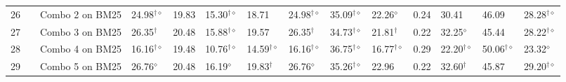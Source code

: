 \begin{table*}
{\begin{tabular}{ccllllllllllll}
26  &  & Combo 2 on BM25  & 24.98$^{\dagger\diamond}$  & 19.83  & 15.30$^{\dagger\diamond}$  & 18.71  & 24.98$^{\dagger\diamond}$  & 35.09$^{\dagger\diamond}$  & 22.26$^{\diamond}$  & 0.24  & 30.41  & 46.09  & 28.28$^{\dagger\diamond}$ \tabularnewline
27  &  & Combo 3 on BM25  & 26.35$^{\dagger}$  & 20.48  & 15.88$^{\dagger\diamond}$  & 19.57  & 26.35$^{\dagger}$  & 34.73$^{\dagger\diamond}$  & 21.81$^{\dagger}$  & 0.22  & 32.25$^{\diamond}$  & 45.44  & 28.22$^{\dagger\diamond}$\tabularnewline
28  &  & Combo 4 on BM25  & 16.16$^{\dagger\diamond}$  & 19.48  & 10.76$^{\dagger\diamond}$  & 14.59$^{\dagger\diamond}$  & 16.16$^{\dagger\diamond}$  & 36.75$^{\dagger\diamond}$  & 16.77$^{\dagger\diamond}$  & 0.29  & 22.20$^{\dagger\diamond}$  & 50.06$^{\dagger\diamond}$  & 23.32$^{\diamond}$\tabularnewline
29  &  & Combo 5 on BM25  & 26.76$^{\diamond}$  & 20.48  & 16.19$^{\diamond}$  & 19.83$^{\dagger}$  & 26.76$^{\diamond}$  & 35.26$^{\dagger\diamond}$  & 22.96  & 0.22  & 32.60$^{\dagger}$  & 45.87  & 29.20$^{\dagger\diamond}$\tabularnewline
\bottomrule
\end{tabular}} %
\end{table*}
